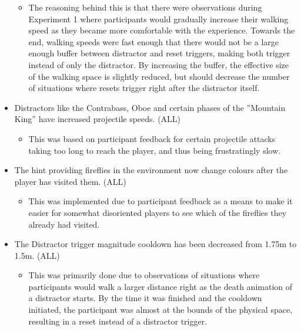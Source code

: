 \begin{itemize}
    \begin{itemize}
        \item The reasoning behind this is that there were observations during Experiment 1 where participants would gradually increase their walking speed as they became more comfortable with the experience. Towards the end, walking speeds were fast enough that there would not be a large enough buffer between distractor and reset triggers, making both trigger instead of only the distractor. By increasing the buffer, the effective size of the walking space is slightly reduced, but should decrease the number of situations where resets trigger right after the distractor itself.  
    \end{itemize}
    \item Distractors like the Contrabass, Oboe and certain phases of the ''Mountain King'' have increased projectile speeds. (ALL)
    \begin{itemize}
        \item This was based on participant feedback for certain projectile attacks taking too long to reach the player, and thus being frustratingly slow. 
    \end{itemize}
    \item The hint providing fireflies in the environment now change colours after the player has visited them. (ALL)
    \begin{itemize}
        \item This was implemented due to participant feedback as a means to make it easier for somewhat disoriented players to see which of the fireflies they already had visited. 
    \end{itemize}
    \item The Distractor trigger magnitude cooldown has been decreased from 1.75m to 1.5m. (ALL)
    \begin{itemize}
        \item This was primarily done due to observations of situations where participants would walk a larger distance right as the death animation of a distractor starts. By the time it was finished and the cooldown initiated, the participant was almost at the bounds of the physical space, resulting in a reset instead of a distractor trigger. 
    \end{itemize}
\end{itemize}